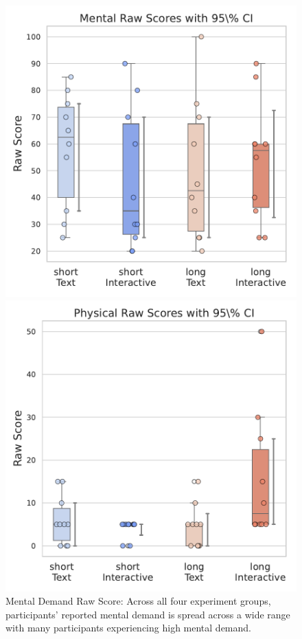 \begin{figure}[h]
    \begin{minipage}[t]{0.45\textwidth}
        \centering
        \includegraphics[width=\textwidth, trim=0 13 0 13, clip]{content/image/cog/Mental_scores.pdf}
        \captionsetup{width=0.9\textwidth, justification=justified}
        \caption{Mental Demand Raw Score: Across all four experiment groups, participants' reported mental demand is spread across a wide range with many participants experiencing high mental demand.}
        \label{fig:mental_cog_score}
    \end{minipage}
    \hfill
    \begin{minipage}[t]{0.45\textwidth}
        \centering
        \includegraphics[width=\textwidth, trim=0 13 0 13, clip]{content/image/cog/Physical_scores.pdf}

\end{minipage}
\end{figure}
